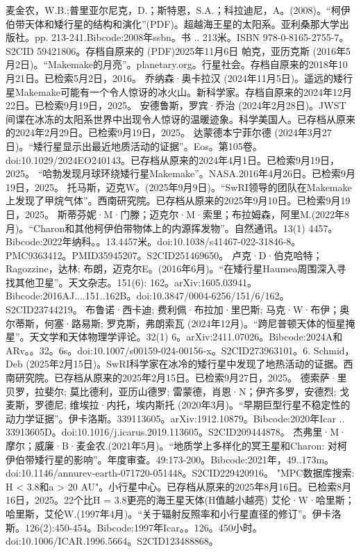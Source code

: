 \begin{enumerate}
 麦金农，W.B.;普里亚尔尼克，D.；斯特恩，S.A.；科拉迪尼，A。(2008)。“柯伊伯带天体和矮行星的结构和演化”(PDF)。超越海王星的太阳系。亚利桑那大学出版社。pp. 213-241.Bibcode:2008年ssbn。书 .. 213米。ISBN  978-0-8165-2755-7。S2CID 59421806。存档自原来的 (PDF)2025年11月6日
 帕克，亚历克斯 (2016年5月2日)。“Makemake的月亮”。planetary.org。行星社会。存档自原来的2018年10月21日。已检索5月2日，2016。
 乔纳森·奥卡拉汉 (2024年11月5日)。遥远的矮行星Makemake可能有一个令人惊讶的冰火山。新科学家。存档自原来的2024年12月22日。已检索9月19日，2025。
 安德鲁斯，罗宾·乔治 (2024年2月28日)。JWST间谍在冰冻的太阳系世界中出现令人惊讶的温暖迹象。科学美国人。已存档从原来的2024年2月29日。已检索9月19日，2025。
 达蒙德本宁菲尔德 (2024年3月27日)。“矮行星显示出最近地质活动的证据”。Eos。第105卷。doi:10.1029/2024EO240143。已存档从原来的2024年4月1日。已检索9月19日，2025。
 “哈勃发现月球环绕矮行星Makemake”。NASA.2016年4月26日。已检索9月19日，2025。
 托马斯，迈克W。(2025年9月9日)。“SwRI领导的团队在Makemake上发现了甲烷气体”。西南研究院。已存档从原来的2025年9月10日。已检索9月19日，2025。
 斯蒂芬妮·M·门滕；迈克尔·M·索里；布拉姆森，阿里M.(2022年8月)。“Charon和其他柯伊伯带物体上的内源挥发物”。自然通讯。13(1) 4457。Bibcode:2022年纳科。。13.4457米。doi:10.1038/s41467-022-31846-8。PMC9363412。PMID35945207。S2CID251469650。   
 卢克·D·伯克哈特；Ragozzine，达林; 布朗，迈克尔E。(2016年6月)。“在矮行星Haumea周围深入寻找其他卫星”。天文杂志。151(6): 162。arXiv:1605.03941。Bibcode:2016AJ....151..162B。doi:10.3847/0004-6256/151/6/162。S2CID23744219。 
 布鲁诺·西卡迪; 费利佩·布拉加·里巴斯; 马克·W·布伊；奥尔蒂斯，何塞·路易斯; 罗克斯，弗朗索瓦 (2024年12月)。“跨尼普顿天体的恒星掩星”。天文学和天体物理学评论。32(1) 6。arXiv:2411.07026。Bibcode:2024A和ARv。。32。6s。doi:10.1007/s00159-024-00156-x。S2CID273963101。6. 
 Schmid，Deb (2025年2月15日)。SwRI科学家在冰冷的矮行星中发现了地热活动的证据。西南研究院。已存档从原来的2025年2月15日。已检索9月27日，2025。
 德索萨·里贝罗，拉斐尔; 莫比德利，亚历山德罗; 雷蒙德，肖恩·N；伊齐多罗，安德烈; 戈麦斯，罗德尼; 维埃拉·内托，埃内斯托 (2020年3月)。“早期巨型行星不稳定性的动力学证据”。伊卡洛斯。339113605。arXiv:1912.10879。Bibcode:2020年Icar .. 33913605D。doi:10.1016/j.icarus.2019.113605。S2CID209444878。 
 杰弗里·M·摩尔；威廉·B·麦金农.(2021年5月)。“地质学上多样化的冥王星和Charon: 对柯伊伯带矮行星的影响”。年度审查。49:173-200。Bibcode:2021年，49..173m。doi:10.1146/annurev-earth-071720-051448。S2CID229420916。 
 "MPC数据库搜索: H < 3.8和a > 20 AU"。小行星中心。已存档从原来的2025年8月16日。已检索8月16日，2025。22个比H = 3.8更亮的海王星天体(H值越小越亮)
 艾伦·W·哈里斯；哈里斯，艾伦W.(1997年4月)。“关于辐射反照率和小行星直径的修订”。伊卡洛斯。126(2):450-454。Bibcode:1997年Icar。。126。450小时。doi:10.1006/ICAR.1996.5664。S2CID123488868。 

\end{enumerate}
